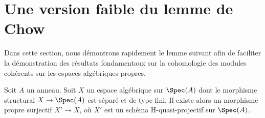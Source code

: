 \section{Une version faible du lemme de Chow}
\label{section-weak-chow}

\noindent
Dans cette section, nous démontrons rapidement le lemme suivant afin
de faciliter la démonstration des résultats fondamentaux sur la cohomologie des
modules cohérents sur les espaces algébriques propres.

\begin{lemma}
\label{lemma-weak-chow}
Soit $A$ un anneau. Soit $X$ un espace algébrique sur $\Spec(A)$
dont le morphisme structural $X \to \Spec(A)$ est séparé et de type fini.
Il existe alors un morphisme propre surjectif $X' \to X$,
où $X'$ est un schéma H-quasi-projectif sur $\Spec(A)$.
\end{lemma}

